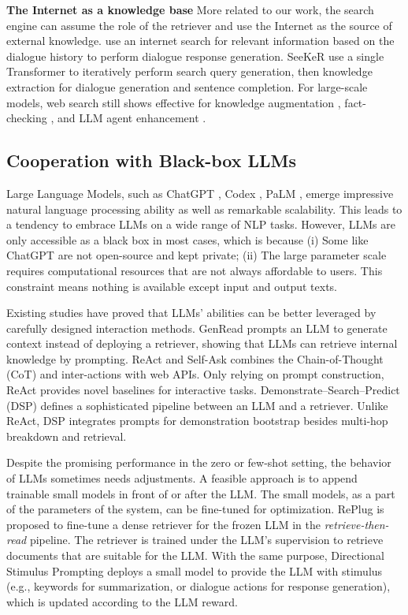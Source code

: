 \noindent \textbf{The Internet as a knowledge base} \quad
More related to our work, the search engine can assume the role of the retriever and use the Internet as the source of external knowledge.
\citet{komeili-etal-2022-internet} use an internet search for relevant information based on the dialogue history to perform dialogue response generation.
SeeKeR \cite{DBLP:conf/emnlp/0001KARSW22} use a single Transformer to iteratively perform search query generation, then knowledge extraction for dialogue generation and sentence completion.
For large-scale models, web search still shows effective for knowledge augmentation \cite{lazaridou2022internet}, fact-checking \cite{menick2022teaching}, and LLM agent enhancement \cite{yao2023react}.

\subsection{Cooperation with Black-box LLMs}
Large Language Models, such as ChatGPT \cite{ouyang2022training}, Codex \cite{codex2021chen}, PaLM \cite{chowdhery2022palm}, emerge impressive natural language processing ability as well as remarkable scalability.
This leads to a tendency to embrace LLMs on a wide range of NLP tasks.
However, LLMs are only accessible as a black box in most cases, which is because
(i) Some like ChatGPT are not open-source and kept private;
(ii) The large parameter scale requires computational resources that are not always affordable to users.
This constraint means nothing is available except input and output texts.

Existing studies have proved that LLMs' abilities can be better leveraged by carefully designed interaction methods.
GenRead \cite{yu2023generate} prompts an LLM to generate context instead of deploying a retriever, showing that LLMs can retrieve internal knowledge by prompting.
ReAct \cite{yao2023react} and Self-Ask \cite{press2022measuring} combines the Chain-of-Thought (CoT) \cite{cot/nips/Wei0SBIXCLZ22, selfconsistency2022wang} and inter-actions with web APIs. Only relying on prompt construction, ReAct provides novel baselines for interactive tasks.
Demonstrate–Search–Predict (DSP) \cite{khattab2022dsp} defines a sophisticated pipeline between an LLM and a retriever. Unlike ReAct, DSP integrates prompts for demonstration bootstrap besides multi-hop breakdown and retrieval.

Despite the promising performance in the zero or few-shot setting, the behavior of LLMs sometimes needs adjustments.
A feasible approach is to append trainable small models in front of or after the LLM. 
The small models, as a part of the parameters of the system, can be fine-tuned for optimization. 
RePlug \cite{shi2023replug} is proposed to fine-tune a dense retriever for the frozen LLM in the \textit{retrieve-then-read} pipeline. The retriever is trained under the LLM's supervision to retrieve documents that are suitable for the LLM. 
With the same purpose, Directional Stimulus Prompting \cite{li2023guiding} deploys a small model to provide the LLM with stimulus (e.g., keywords for summarization, or dialogue actions for response generation), which is updated according to the LLM reward.

